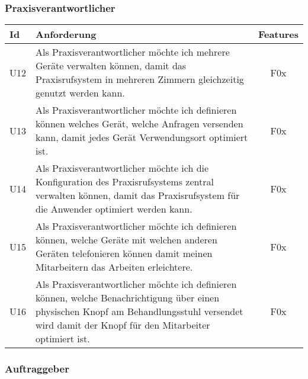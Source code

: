\clearpage

\subsubsection*{Praxisverantwortlicher}

\begin{table}[h]
    \centering
    \begin{tabular}{|l|p{13cm}|c|}
        \hline
        \textbf{Id} & \textbf{Anforderung}                                                                                                                                                                               & \textbf{Features} \\
        \hline
        U12         & Als Praxisverantwortlicher möchte ich mehrere Geräte verwalten können, damit das Praxisrufsystem in mehreren Zimmern gleichzeitig genutzt werden kann. & F0x \\
        \hline
        U13         & Als Praxisverantwortlicher möchte ich definieren können welches Gerät, welche Anfragen versenden kann, damit jedes Gerät Verwendungsort optimiert ist. & F0x \\
        \hline
        U14         & Als Praxisverantwortlicher möchte ich die Konfiguration des Praxisrufsystems zentral verwalten können, damit das Praxisrufsystem für die Anwender optimiert werden kann. & F0x \\
        \hline
        U15         & Als Praxisverantwortlicher möchte ich definieren können, welche Geräte mit welchen anderen Geräten telefonieren können damit meinen Mitarbeitern das Arbeiten erleichtere. & F0x \\
        \hline
        U16         & Als Praxisverantwortlicher möchte ich definieren können, welche Benachrichtigung über einen physischen Knopf am Behandlungsstuhl versendet wird damit der Knopf für den Mitarbeiter optimiert ist. & F0x \\
        \hline
    \end{tabular}\label{tab:userstories2}
\end{table}


\clearpage

\subsubsection*{Auftraggeber}\label{subsec:auftraggeber}

